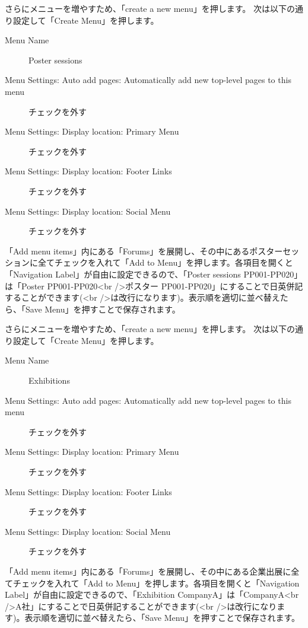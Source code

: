 \documentclass[titlepage,10pt,a4paper,uplatex]{jsbook}
\begin{document}
さらにメニューを増やすため、「create a new menu」を押します。
次は以下の通り設定して「Create Menu」を押します。

\begin{description}
\item[Menu Name] Poster sessions
\item[Menu Settings: Auto add pages: Automatically add new top-level pages to this menu] チェックを外す
\item[Menu Settings: Display location: Primary Menu] チェックを外す
\item[Menu Settings: Display location: Footer Links] チェックを外す
\item[Menu Settings: Display location: Social Menu] チェックを外す
\end{description}

「Add menu items」内にある「Forums」を展開し、その中にあるポスターセッションに全てチェックを入れて「Add to Menu」を押します。各項目を開くと「Navigation Label」が自由に設定できるので、「Poster sessions PP001-PP020」は「Poster PP001-PP020{\textless}br /{\textgreater}ポスター PP001-PP020」にすることで日英併記することができます({\textless}br /{\textgreater}は改行になります)。表示順を適切に並べ替えたら、「Save Menu」を押すことで保存されます。

さらにメニューを増やすため、「create a new menu」を押します。
次は以下の通り設定して「Create Menu」を押します。

\begin{description}
\item[Menu Name] Exhibitions
\item[Menu Settings: Auto add pages: Automatically add new top-level pages to this menu] チェックを外す
\item[Menu Settings: Display location: Primary Menu] チェックを外す
\item[Menu Settings: Display location: Footer Links] チェックを外す
\item[Menu Settings: Display location: Social Menu] チェックを外す
\end{description}

「Add menu items」内にある「Forums」を展開し、その中にある企業出展に全てチェックを入れて「Add to Menu」を押します。各項目を開くと「Navigation Label」が自由に設定できるので、「Exhibition CompanyA」は「CompanyA{\textless}br /{\textgreater}A社」にすることで日英併記することができます({\textless}br /{\textgreater}は改行になります)。表示順を適切に並べ替えたら、「Save Menu」を押すことで保存されます。
\end{document}
